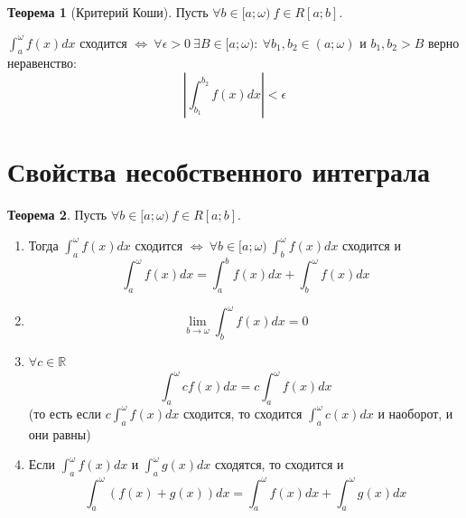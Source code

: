 \documentclass{report}
\theoremstyle{definition}
\newtheorem*{theorem}{Теорема}
\begin{document}
\begin{theorem}[Критерий Коши]
    Пусть $\forall b \in [a;\omega) \ f\in R[a;b]$.

    $\int_{a}^{\omega}f(x)dx$ сходится $\iff \ \forall
        \epsilon > 0 \ \exists B\in [a;\omega): \ \forall b_1,b_2 \in (a;\omega)$ и $b_1,b_2 > B$ верно неравенство:
    \begin{equation*}
        | \int_{b_1}^{b_2}f(x)dx | < \epsilon
    \end{equation*}
\end{theorem}

\section{Свойства несобственного интеграла}

\begin{theorem}
    Пусть $\forall b\in [a;\omega) \ f\in R[a;b]$.
    \begin{enumerate}
        \item Тогда $\int_{a}^{\omega}f(x)dx$ сходится $\iff \ \forall
                  b\in[a;\omega) \ \int_{b}^{\omega}f(x)dx$ сходится и
              \begin{equation*}
                  \int_{a}^{\omega}f(x)dx = \int_{a}^{b}f(x)dx + \int_{b}^{\omega} f(x)dx
              \end{equation*}
        \item
              \begin{equation*}
                  \underset{b\rightarrow\omega}{\lim}\int_{b}^{\omega}f(x)dx = 0
              \end{equation*}
        \item $\forall c \in \mathbb{R}$
              \begin{equation*}
                  \int_{a}^{\omega}cf(x)dx = c\int_{a}^{\omega}f(x)dx
              \end{equation*}
              (то есть если $c\int_{a}^{\omega}f(x)dx$ сходится, то сходится $\int_{a}^{\omega}c(x)dx$ и наоборот,
              и они равны)
        \item Если $\int_{a}^{\omega}f(x)dx$ и $\int_{a}^{\omega}g(x)dx$ сходятся, то сходится и
              \begin{equation*}
                  \int_{a}^{\omega}(f(x) + g(x))dx = \int_{a}^{\omega}f(x)dx + \int_{a}^{\omega}g(x)dx
              \end{equation*}
    \end{enumerate}
\end{theorem}
\end{document}
